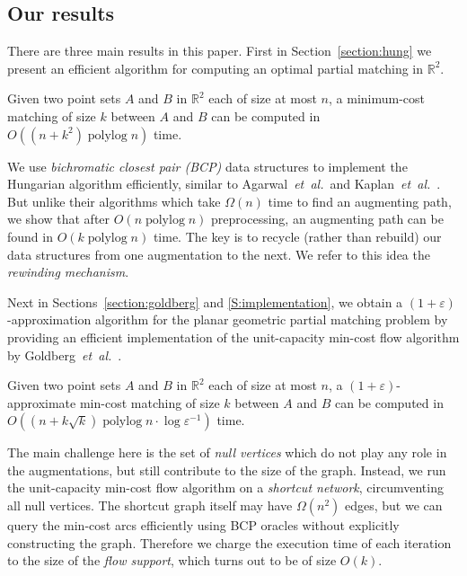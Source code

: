 \documentclass[a4paper,UKenglish]{socg-lipics-v2018}
\def\etal{\emph{et~al.}}
\def\etal{\textit{et~al.}}
\def\polylog{\mathop{\mathrm{polylog}}}
\def\eps{\varepsilon}
\def\reals{\mathbb{R}}
\theoremstyle{plain}
\numberwithin{figure}{section}
\begin{document}
\subsection{Our results}

There are three main results in this paper.
First in Section~\ref{section:hung} we present an efficient algorithm for
computing an optimal partial matching in $\reals^2$.

\begin{theorem}
\label{theorem:hung}
Given two point sets $A$ and $B$ in $\reals^2$ each of size at most $n$,
a minimum-cost matching of size $k$ between $A$ and $B$ can be computed in
$O((n + k^2)\polylog n)$ time.
\end{theorem}

We use \emph{bichromatic closest pair (BCP)} data structures to implement the Hungarian algorithm efficiently, similar to Agarwal~\etal\ and Kaplan~\etal~\cite{KMRSS17,AES99}.
But unlike their algorithms which take $\Omega(n)$ time to find an
augmenting path, we show that after $O(n\polylog n)$ preprocessing,
an augmenting path can be found in $O(k\polylog n)$ time.
The key is to recycle (rather than rebuild) our data structures from one
augmentation to the next.
We refer to this idea the \emph{rewinding mechanism}.

\medskip

Next in Sections~\ref{section:goldberg} and \ref{S:implementation},
we obtain a $(1+\eps)$-approximation algorithm for the planar geometric partial
matching problem by providing an efficient implementation of the unit-capacity min-cost flow algorithm by
Goldberg~\etal~\cite{GHKT17}.

\begin{theorem}
\label{theorem:gmcm}
Given two point sets $A$ and $B$ in $\reals^2$ each of size at most $n$,
a $(1+\eps)$-approximate min-cost matching of size $k$ between $A$
and $B$ can be computed in $O((n + k\sqrt{k})\polylog n \cdot \log\eps^{-1})$ time.
\end{theorem}

The main challenge here is the set of \emph{null vertices}
which do not play any role in the augmentations, but still contribute to the size of the graph.
Instead, we run the unit-capacity min-cost flow algorithm on a
\emph{shortcut network}, circumventing all null vertices.
The shortcut graph itself may have $\Omega(n^2)$ edges, but we can query the min-cost arcs efficiently using BCP oracles without explicitly constructing the graph.
Therefore we charge the execution time of each iteration to the size of the \emph{flow support}, which turns out to be of size $O(k)$.
\end{document}
